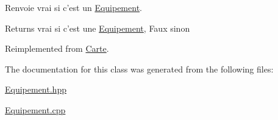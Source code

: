 Renvoie vrai si c'est un \hyperlink{class_equipement}{Equipement}. 

\begin{DoxyReturn}{Returns}
vrai si c'est une \hyperlink{class_equipement}{Equipement}, Faux sinon 
\end{DoxyReturn}


Reimplemented from \hyperlink{class_carte_abcf22b28f170502cb4f17f2c0b7a031f}{Carte}.



The documentation for this class was generated from the following files\-:\begin{DoxyCompactItemize}
\item 
\hyperlink{_equipement_8hpp}{Equipement.\-hpp}\item 
\hyperlink{_equipement_8cpp}{Equipement.\-cpp}\end{DoxyCompactItemize}

